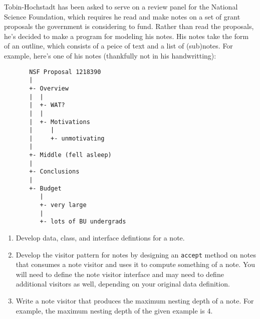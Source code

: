 \documentclass[12pt]{article}                   %
\def\pts#1{\marginpar{\footnotesize \raggedright  \fbox{#1 {\sc Points}}}}
\begin{document}
\ifrubric
\else
{}
\fi
\newpage


\begin{problem} \pts{20}
\noindent
Tobin-Hochstadt has been asked to serve on a review panel for the
National Science Foundation, which requires he read and make notes on
a set of grant proposals the government is considering to fund.
Rather than read the proposals, he's decided to make a program for
modeling his notes.  His notes take the form of an outline, which
consists of a peice of text and a list of (sub)notes.  For example,
here's one of his notes (thankfully not in his handwritting):
\begin{verbatim}
       NSF Proposal 1218390
       |
       +- Overview
       |  |
       |  +- WAT?
       |  |
       |  +- Motivations
       |     |
       |     +- unmotivating
       |
       +- Middle (fell asleep)
       |
       +- Conclusions
       |
       +- Budget
          |
          +- very large
          |
          +- lots of BU undergrads
\end{verbatim}


\newpage

\begin{enumerate}

\item Develop data, class, and interface defintions for a note.

\newpage

\noindent
\item Develop the visitor pattern for notes by designing
  an \texttt{accept} method on notes that
  consumes a note visitor and uses it to compute something of a note.
  You will need to define the note visitor interface and may need to
  define additional visitors as well, depending on your original data
  definition.

\newpage

\noindent
\item Write a note visitor that produces the maximum nesting depth of
  a note.  For example, the maximum nesting depth of the given example
  is 4.




\end{enumerate}
\end{problem}
\end{document}
